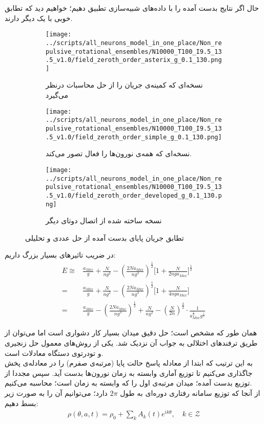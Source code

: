 حال اگر نتایج بدست آمده را با داده‌های شبیه‌سازی تطبیق دهیم؛ خواهیم دید که تطابق خوبی با یک دیگر دارند.

\begin{figure}
	\centering
	\begin{subfigure}[b]{0.5\textwidth}
		\centering
		\texttt{[image: ../scripts/all\_neurons\_model\_in\_one\_place/Non\_repulsive\_rotational\_ensembles/N10000\_T100\_I9.5\_13.5\_v1.0/field\_zeroth\_order\_asterix\_g\_0.1\_130.png]}
		\caption{نسخه‌ای که کمینه‌ی جریان را از حل محاسبات درنظر می‌گیرد}
		\label{fig:e_zeroth_not_all_gifted}
	\end{subfigure}
	\hfill
	\begin{subfigure}[b]{0.5\textwidth}
		\centering
		\texttt{[image: ../scripts/all\_neurons\_model\_in\_one\_place/Non\_repulsive\_rotational\_ensembles/N10000\_T100\_I9.5\_13.5\_v1.0/field\_zeroth\_order\_simple\_g\_0.1\_130.png]}
		\caption{نسخه‌ای که همه‌ی نورون‌ها را فعال تصور می‌کند.}
		\label{fig:e_zeroth_all_gifted}
	\end{subfigure}
	\hfill
	\begin{subfigure}[b]{0.5\textwidth}
		\centering
		\texttt{[image: ../scripts/all\_neurons\_model\_in\_one\_place/Non\_repulsive\_rotational\_ensembles/N10000\_T100\_I9.5\_13.5\_v1.0/field\_zeroth\_order\_developed\_g\_0.1\_130.png]}
		\caption{نسخه ساخته شده از اتصال دوتای دیگر}
		\label{fig:e_zeroth_developed}
	\end{subfigure}
	\caption{تطابق جریان پایای بدست آمده از حل عددی و تحلیلی}
	\label{fig:three graphs}
\end{figure}

در ضریب تاثیرهای بسیار بزرگ داریم:
\begin{align}
	E \cong & \frac{a_{Max}}{g} + \frac{N}{ng^2} - (\frac{2N a_{Max}}{n g^3})^{\frac{1}{2}} \big[ 1 + \frac{N}{2nga_{Max}} \big]^{\frac{1}{2}}\\
	=& \frac{a_{Max}}{g} + \frac{N}{ng^2} - (\frac{2 N a_{Max}}{n g^3})^{\frac{1}{2}} \big[ 1 + \frac{N}{4nga_{Max}} \big]\\
	=& \frac{a_{Max}}{g} - (\frac{2 N a_{Max}}{n g^3})^{\frac{1}{2}} + \frac{N}{ng^2}  - (\frac{N}{2n})^{\frac{3}{2}}  \cdot \frac{1}{ {a^{\frac{1}{2}}_{Max} g^{\frac{5}{2}}}}
\end{align}


همان طور که مشخص است؛ حل دقیق میدان بسیار کار دشواری است اما می‌توان از طریق ترفندهای اختلالی به جواب آن نزدیک شد. یکی از روش‌های معمول حل زنجیری و تودرتوی دستگاه معادلات است. \\
به این ترتیب که ابتدا از معادله  پاسخ حالت پایا (مرتبه‌ی صفرم) را در معادله‌ی پخش جاگذاری می‌کنیم تا توزیع آماری وابسته به زمان نورون‌ها بدست آید. سپس مجددا از توزیع بدست آمده؛ میدان مرتبه‌ی اول را که وابسته به زمان است؛ محاسبه می‌کنیم.\\
از آنجا که توزیع سامانه‌ رفتاری دوره‌ای به طول $2\pi$ دارد؛ می‌توانیم آن را به صورت زیر بسط دهیم:
\begin{align}
	\rho(\theta, a, t) = \rho_0 + \sum_k A_k(t) e^{ik\theta}, \quad k \in \mathcal{Z}
\end{align}

